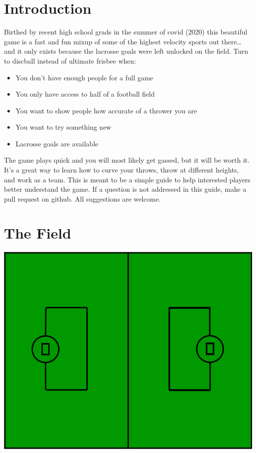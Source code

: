 \documentclass[10pt]{article}
\begin{document}
    \renewcommand*\contentsname{Table of Contents}
    \tableofcontents

    \newpage

    \section{Introduction}

        Birthed by recent high school grads in the summer of covid (2020) this beautiful game is a fast and fun mixup of some of the highest velocity sports out there\ldots and it only exists because the lacrosse goals were left unlocked on the field. Turn to discball instead of ultimate frisbee when: 

        \begin{itemize}
            \item You don't have enough people for a full game
            \item You only have access to half of a football field
            \item You want to show people how accurate of a thrower you are
            \item You want to try something new
            \item Lacrosse goals are available
        \end{itemize}

        The game plays quick and you will most likely get gassed, but it will be worth it. It's a great way to learn how to curve your throws, throw at different heights, and work as a team. This is meant to be a simple guide to help interested players better understand the game. If a question is not addressed in this guide, make a pull request on github. All suggestions are welcome.

    \section{The Field}

        \includegraphics[width=.7\textwidth]{field/field}
\end{document}
